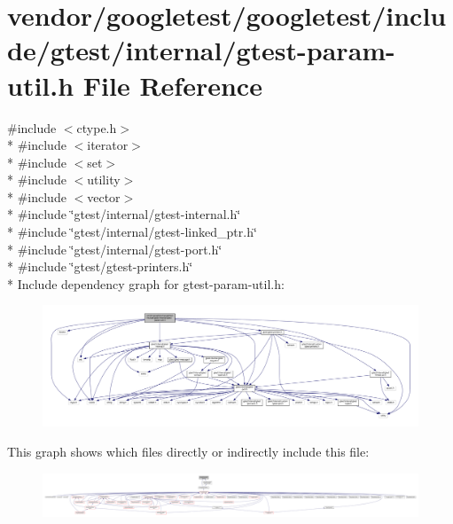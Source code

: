 \hypertarget{gtest-param-util_8h}{}\section{vendor/googletest/googletest/include/gtest/internal/gtest-\/param-\/util.h File Reference}
\label{gtest-param-util_8h}
{\ttfamily \#include $<$ctype.\+h$>$}\\*
{\ttfamily \#include $<$iterator$>$}\\*
{\ttfamily \#include $<$set$>$}\\*
{\ttfamily \#include $<$utility$>$}\\*
{\ttfamily \#include $<$vector$>$}\\*
{\ttfamily \#include \char`\"{}gtest/internal/gtest-\/internal.\+h\char`\"{}}\\*
{\ttfamily \#include \char`\"{}gtest/internal/gtest-\/linked\+\_\+ptr.\+h\char`\"{}}\\*
{\ttfamily \#include \char`\"{}gtest/internal/gtest-\/port.\+h\char`\"{}}\\*
{\ttfamily \#include \char`\"{}gtest/gtest-\/printers.\+h\char`\"{}}\\*
Include dependency graph for gtest-\/param-\/util.h\+:\nopagebreak
\begin{figure}[H]
\begin{center}
\leavevmode
\includegraphics[width=350pt]{gtest-param-util_8h__incl}
\end{center}
\end{figure}
This graph shows which files directly or indirectly include this file\+:\nopagebreak
\begin{figure}[H]
\begin{center}
\leavevmode
\includegraphics[width=350pt]{gtest-param-util_8h__dep__incl}
\end{center}
\end{figure}
